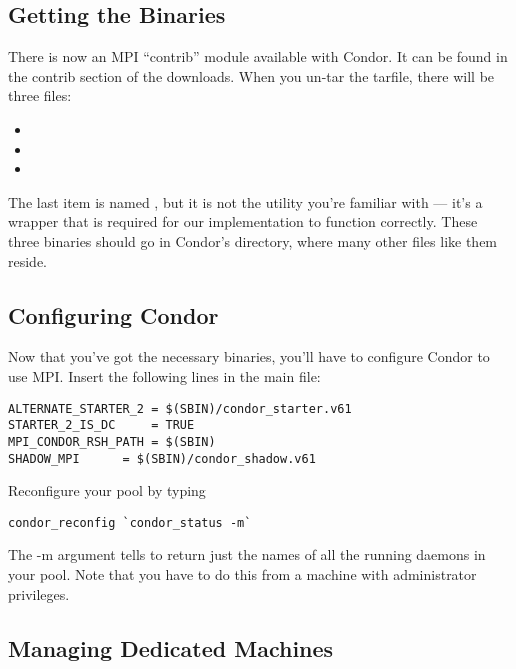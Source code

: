 \subsection{\label{sec:MPI-binaries}Getting the Binaries}

There is now an MPI ``contrib'' module available with Condor.  It can
be found in the contrib section of the downloads.  When you un-tar the 
tarfile, there will be three files:

\begin{itemize}
\item{}
\item{}
\item{}
\end{itemize}

The last item is named , but it is not the  utility you're 
familiar with --- it's a wrapper that is required for our implementation to 
function correctly. 
These three binaries should go in Condor's  directory, where
many other files like them reside.

\subsection{\label{sec:MPI-config}Configuring Condor }

Now that you've got the necessary binaries, you'll have to configure Condor
to use MPI.  Insert the following lines in the main  file:
\begin{verbatim}
ALTERNATE_STARTER_2	= $(SBIN)/condor_starter.v61
STARTER_2_IS_DC		= TRUE
MPI_CONDOR_RSH_PATH	= $(SBIN)
SHADOW_MPI		= $(SBIN)/condor_shadow.v61
\end{verbatim}
Reconfigure your pool by typing
\begin{verbatim}
condor_reconfig `condor_status -m`
\end{verbatim}
The -m argument tells  to return just the names of all
the running  daemons in your pool.  Note that you have to do 
this from a machine with administrator privileges.

\subsection{\label{sec:MPI-machines}Managing Dedicated Machines}

